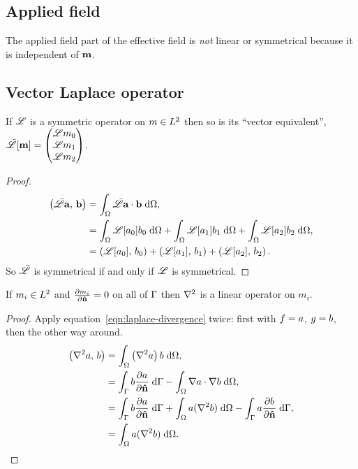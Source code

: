 \subsection{Applied field}

The applied field part of the effective field is \emph{not} linear or symmetrical because it is independent of $\mv$.

\subsection{Vector Laplace operator}

\begin{theorem}
  If $\lop$ is a symmetric operator on $m \in \ltwo$ then so is its ``vector equivalent'', $\bar{\lop}[\mv] = \threevec{\lop m_0}{\lop m_1}{\lop m_2}$.
\end{theorem}

\begin{proof}
  \begin{equation}
    \begin{aligned}
      \ip{\bar{\lop}\av}{\bv} &= \intd{ \bar{\lop} \av \cdot \bv}, \\
      &= \intd{\lop[a_0] b_0} + \intd{\lop[a_1] b_1} + \intd{\lop[a_2] b_2}, \\
      & = \ip{\lop[a_0]}{b_0} + \ip{\lop[a_1]}{b_1} + \ip{\lop[a_2]}{b_2}.
    \end{aligned}
  \end{equation}
  So $\bar{\lop}$ is symmetrical if and only if $\lop$ is symmetrical.
\end{proof}

\begin{theorem}
  If $m_i \in \ltwo$ and $\ddn{m_i} = 0$ on all of $\boundd$ then $\lap$ is a linear operator on $m_i$.
\end{theorem}
\begin{proof}
  Apply equation~\cref{eqn:laplace-divergence} twice: first with $\ff = a$, $\gf = b$, then the other way around.
  \begin{equation}
    \begin{aligned}
      \ip{\lap a}{b} &= \intd{\left(\lap a \right) b}, \\
      &= \intb{b \ddn{a}} - \intd{\grad a \cdot \grad b}, \\
      &= \intb{b \ddn{a}} + \intd{a (\lap b)} - \intb{a \ddn{b}}, \\
      &= \intd{a (\lap b)}.
    \end{aligned}
  \end{equation}
\end{proof}


